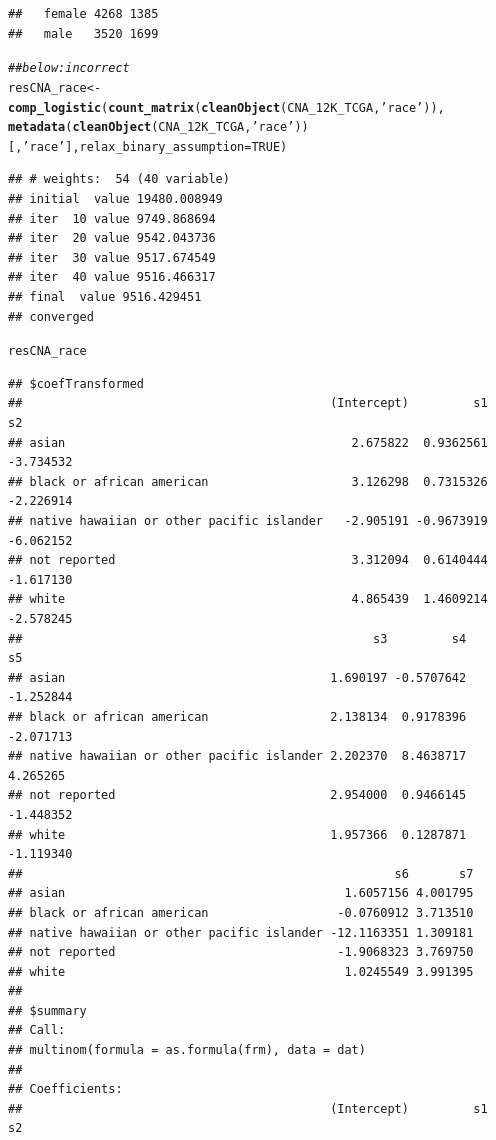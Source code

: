 \documentclass{article}\usepackage[]{graphicx}\usepackage[]{color}
\makeatletter
\newcommand{\hlnum}[1]{\textcolor[rgb]{0.686,0.059,0.569}{#1}}%
\newcommand{\hlstr}[1]{\textcolor[rgb]{0.192,0.494,0.8}{#1}}%
\newcommand{\hlcom}[1]{\textcolor[rgb]{0.678,0.584,0.686}{\textit{#1}}}%
\newcommand{\hlstd}[1]{\textcolor[rgb]{0.345,0.345,0.345}{#1}}%
\newcommand{\hlkwb}[1]{\textcolor[rgb]{0.69,0.353,0.396}{#1}}%
\newcommand{\hlkwc}[1]{\textcolor[rgb]{0.333,0.667,0.333}{#1}}%
\newcommand{\hlkwd}[1]{\textcolor[rgb]{0.737,0.353,0.396}{\textbf{#1}}}%
\newenvironment{kframe}{%
 \def\at@end@of@kframe{}%
 \ifinner\ifhmode%
  \def\at@end@of@kframe{\end{minipage}}%
  \begin{minipage}{\columnwidth}%
 \fi\fi%
 \def\FrameCommand##1{\hskip\@totalleftmargin \hskip-\fboxsep
 \colorbox{shadecolor}{##1}\hskip-\fboxsep
     \hskip-\linewidth \hskip-\@totalleftmargin \hskip\columnwidth}%
 \MakeFramed {\advance\hsize-\width
   \@totalleftmargin\z@ \linewidth\hsize
   \@setminipage}}%
 {\par\unskip\endMakeFramed%
 \at@end@of@kframe}
\newenvironment{knitrout}{}{} %
\makeatother
\begin{document}
\begin{knitrout}
\begin{kframe}
\begin{verbatim}
##   female 4268 1385
##   male   3520 1699
\end{verbatim}
\begin{alltt}
\hlcom{## below: incorrect}
\hlstd{resCNA_race} \hlkwb{<-} \hlkwd{comp_logistic}\hlstd{(}\hlkwd{count_matrix}\hlstd{(}\hlkwd{cleanObject}\hlstd{(CNA_12K_TCGA,} \hlstr{'race'}\hlstd{)),}
                              \hlkwd{metadata}\hlstd{(}\hlkwd{cleanObject}\hlstd{(CNA_12K_TCGA,} \hlstr{'race'}\hlstd{))[,}\hlstr{'race'}\hlstd{],} \hlkwc{relax_binary_assumption} \hlstd{=} \hlnum{TRUE}\hlstd{)}
\end{alltt}
\begin{verbatim}
## # weights:  54 (40 variable)
## initial  value 19480.008949 
## iter  10 value 9749.868694
## iter  20 value 9542.043736
## iter  30 value 9517.674549
## iter  40 value 9516.466317
## final  value 9516.429451 
## converged
\end{verbatim}
\begin{alltt}
\hlstd{resCNA_race}
\end{alltt}
\begin{verbatim}
## $coefTransformed
##                                           (Intercept)         s1        s2
## asian                                        2.675822  0.9362561 -3.734532
## black or african american                    3.126298  0.7315326 -2.226914
## native hawaiian or other pacific islander   -2.905191 -0.9673919 -6.062152
## not reported                                 3.312094  0.6140444 -1.617130
## white                                        4.865439  1.4609214 -2.578245
##                                                 s3         s4        s5
## asian                                     1.690197 -0.5707642 -1.252844
## black or african american                 2.138134  0.9178396 -2.071713
## native hawaiian or other pacific islander 2.202370  8.4638717  4.265265
## not reported                              2.954000  0.9466145 -1.448352
## white                                     1.957366  0.1287871 -1.119340
##                                                    s6       s7
## asian                                       1.6057156 4.001795
## black or african american                  -0.0760912 3.713510
## native hawaiian or other pacific islander -12.1163351 1.309181
## not reported                               -1.9068323 3.769750
## white                                       1.0245549 3.991395
## 
## $summary
## Call:
## multinom(formula = as.formula(frm), data = dat)
## 
## Coefficients:
##                                           (Intercept)         s1        s2

\end{verbatim}
\end{kframe}
\end{knitrout}
\end{document}

